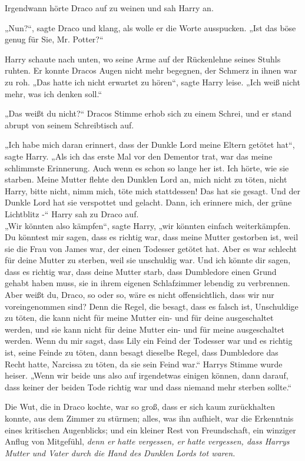 {Irgendwann hörte Draco auf zu weinen und sah Harry an.

„Nun?“, sagte Draco und klang, als wolle er die Worte ausspucken. „Ist das böse genug für Sie, Mr. Potter?“

Harry schaute nach unten, wo seine Arme auf der Rückenlehne seines Stuhls ruhten. Er konnte Dracos Augen nicht mehr begegnen, der Schmerz in ihnen war zu roh. „Das hatte ich nicht erwartet zu hören“, sagte Harry leise. „Ich weiß nicht mehr, was ich denken soll.“

„Das weißt du nicht?“ Dracos Stimme erhob sich zu einem Schrei, und er stand abrupt von seinem Schreibtisch auf.

„Ich habe mich daran erinnert, dass der Dunkle Lord meine Eltern getötet hat“, sagte Harry. „Als ich das erste Mal vor den Dementor trat, war das meine schlimmste Erinnerung. Auch wenn es schon so lange her ist. Ich hörte, wie sie starben. Meine Mutter flehte den Dunklen Lord an, mich nicht zu töten, nicht Harry, bitte nicht, nimm mich, töte mich stattdessen! Das hat sie gesagt. Und der Dunkle Lord hat sie verspottet und gelacht. Dann, ich erinnere mich, der grüne Lichtblitz -“ Harry sah zu Draco auf.\\ „Wir könnten also kämpfen“, sagte Harry, „wir könnten einfach weiterkämpfen. Du könntest mir sagen, dass es richtig war, dass meine Mutter gestorben ist, weil sie die Frau von James war, der einen Todesser getötet hat. Aber es war schlecht für deine Mutter zu sterben, weil sie unschuldig war. Und ich könnte dir sagen, dass es richtig war, dass deine Mutter starb, dass Dumbledore einen Grund gehabt haben muss, sie in ihrem eigenen Schlafzimmer lebendig zu verbrennen. Aber weißt du, Draco, so oder so, wäre es nicht offensichtlich, dass wir nur voreingenommen sind? Denn die Regel, die besagt, dass es falsch ist, Unschuldige zu töten, die kann nicht für meine Mutter ein- und für deine ausgeschaltet werden, und sie kann nicht für deine Mutter ein- und für meine ausgeschaltet werden. Wenn du mir sagst, dass Lily ein Feind der Todesser war und es richtig ist, seine Feinde zu töten, dann besagt dieselbe Regel, dass Dumbledore das Recht hatte, Narcissa zu töten, da sie sein Feind war.“ Harrys Stimme wurde heiser. „Wenn wir beide uns also auf irgendetwas einigen können, dann darauf, dass keiner der beiden Tode richtig war und dass niemand mehr sterben sollte.“

Die Wut, die in Draco kochte, war so groß, dass er sich kaum zurückhalten konnte, aus dem Zimmer zu stürmen; alles, was ihn aufhielt, war die Erkenntnis eines kritischen Augenblicks; und ein kleiner Rest von Freundschaft, ein winziger Anflug von Mitgefühl, \emph{denn er hatte vergessen, er hatte vergessen, dass Harrys Mutter und Vater durch die Hand des Dunklen Lords tot waren.}

}
